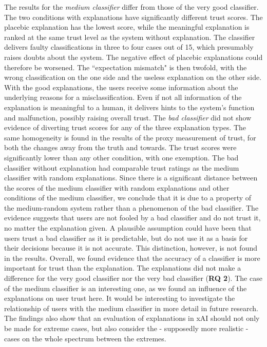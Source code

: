 The results for the \textit{medium classifier} differ from those of the very good classifier. The two conditions with explanations have significantly different trust scores. The placebic explanation has the lowest score, while the meaningful explanation is ranked at the same trust level as the system without explanation. The classifier delivers faulty classifications in three to four cases out of 15, which presumably raises doubts about the system. The negative effect of placebic explanations could therefore be worsened. The ``expectation mismatch" is then twofold, with the wrong classification on the one side and the useless explanation on the other side. With the good explanations, the users receive some information about the underlying reasons for a misclassification. Even if not all information of the explanation is meaningful to a human, it delivers hints to the system's function and malfunction, possibly raising overall trust.\newline
The \textit{bad classifier} did not show evidence of diverting trust scores for any of the three explanation types. The same homogeneity is found in the results of the proxy measurement of trust, for both the changes away from the truth and towards. The trust scores were significantly lower than any other condition, with one exemption. The bad classifier without explanation had comparable trust ratings as the medium classifier with random explanations. Since there is a significant distance between the scores of the medium classifier with random explanations and other conditions of the medium classifier, we conclude that it is due to a property of the medium-random system rather than a phenomenon of the bad classifier. The evidence suggests that users are not fooled by a bad classifier and do not trust it, no matter the explanation given. A plausible assumption could have been that users trust a bad classifier as it is predictable, but do not use it as a basis for their decisions because it is not accurate. This distinction, however, is not found in the results.\newline
Overall, we found evidence that the accuracy of a classifier is more important for trust than the explanation. The explanations did not make a difference for the very good classifier nor the very bad classifier (\textbf{RQ 2}). The case of the medium classifier is an interesting one, as we found an influence of the explanations on user trust here. It would be interesting to investigate the relationship of users with the medium classifier in more detail in future research. The findings also show that an evaluation of explanations in xAI should not only be made for extreme cases, but also consider the - supposedly more realistic - cases on the whole spectrum between the extremes. \medskip \newline
